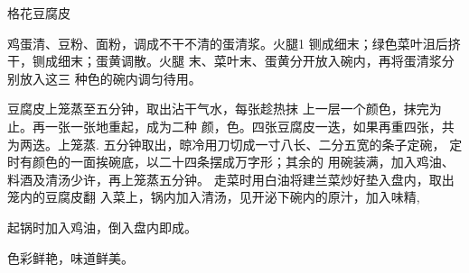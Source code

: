 \begin{recipe}{格花豆腐皮}

\ingredients


\cooking

\step 	鸡蛋清、豆粉、面粉，调成不干不清的蛋清浆。火腿1 铡成细末；绿色菜叶沮后挤干，铡成细末；蛋黄调散。火腿 末、菜叶末、蛋黄分开放入碗内，再将蛋清浆分别放入这三 种色的碗内调匀待用。

\step 	豆腐皮上笼蒸至五分钟，取出沾干气水，每张趁热抹 上一层一个颜色，抹完为止。再一张一张地重起，成为二种 颜，色。四张豆腐皮一迭，如果再重四张，共为两迭。上笼蒸. 五分钟取出，晾冷用刀切成一寸八长、二分五宽的条子定碗， 定时有颜色的一面挨碗底，以二十四条摆成万字形；其余的 用碗装满，加入鸡油、料酒及清汤少许，再上笼蒸五分钟。 走菜时用白油将建兰菜炒好垫入盘内，取出笼内的豆腐皮翻 入菜上，锅内加入清汤，见开泌下碗内的原汁，加入味精,

起锅时加入鸡油，倒入盘内即成。

\notes

色彩鲜艳，味道鲜美。

\end{recipe}

